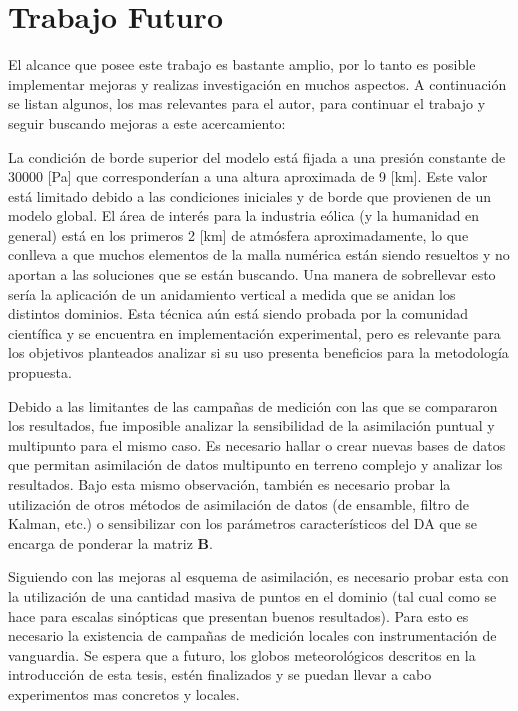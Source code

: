 \section{Trabajo Futuro}
El alcance que posee este trabajo es bastante amplio, por lo tanto es posible implementar mejoras y realizas investigación en muchos aspectos. A continuación se listan algunos, los mas relevantes para el autor, para continuar el trabajo y seguir buscando mejoras a este acercamiento:
\begin{itemize*}
	\item La condición de borde superior del modelo está fijada a una presión constante de $30000$ [Pa] que corresponderían a una altura aproximada de 9 [km]. Este valor está limitado debido a las condiciones iniciales y de borde que provienen de un modelo global. El área de interés para la industria eólica (y la humanidad en general) está en los primeros 2 [km] de atmósfera aproximadamente, lo que conlleva a que muchos elementos de la malla numérica están siendo resueltos y no aportan a las soluciones que se están buscando. Una manera de sobrellevar esto sería la aplicación de un anidamiento vertical a medida que se anidan los distintos dominios. Esta técnica aún está siendo probada por la comunidad científica y se encuentra en implementación experimental, pero es relevante para los objetivos planteados analizar si su uso presenta beneficios para la metodología propuesta.
	\item Debido a las limitantes de las campañas de medición con las que se compararon los resultados, fue imposible analizar la sensibilidad de la asimilación puntual y multipunto para el mismo caso. Es necesario hallar o crear nuevas bases de datos que permitan asimilación de datos multipunto en terreno complejo y analizar los resultados. Bajo esta mismo observación, también es necesario probar la utilización de otros métodos de asimilación de datos (de ensamble, filtro de Kalman, etc.) o sensibilizar con los parámetros característicos del DA que se encarga de ponderar la matriz $\textbf{B}$.
	\item Siguiendo con las mejoras al esquema de asimilación, es necesario probar esta con la utilización de una cantidad masiva de puntos en el dominio (tal cual como se hace para escalas sinópticas que presentan buenos resultados). Para esto es necesario la existencia de campañas de medición locales con instrumentación de vanguardia. Se espera que a futuro, los globos meteorológicos descritos en la introducción de esta tesis, estén finalizados y se puedan llevar a cabo experimentos mas concretos y locales.

\end{itemize*}
